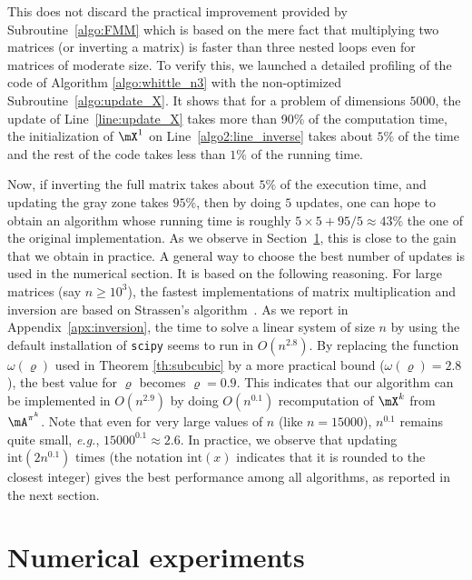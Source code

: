 This does not discard the practical improvement provided by Subroutine~\ref{algo:FMM} which is based on the mere fact that multiplying  two matrices (or inverting a matrix) is faster than three nested loops even for matrices of moderate size. To verify this, we launched  a detailed profiling of the code of Algorithm \ref{algo:whittle_n3} with the non-optimized Subroutine~\ref{algo:update_X}. It shows that for a problem of dimensions $5000$, the update of Line~\ref{line:update_X} takes more than 90\% of the computation time, the initialization of $\mX^1$ on Line~\ref{algo2:line_inverse} takes about $5\%$ of the time and the rest of the code takes less than $1\%$ of the running time.

Now, if inverting the full matrix takes about $5\%$ of the execution time, and updating the gray zone takes $95\%$, then by doing $5$ updates, one can hope to obtain an algorithm whose running time is roughly $5\times5 + 95/5\approx43\%$ the one of the original implementation. As we observe in Section~\ref{sec:numerical}, this is close to the gain that we obtain in practice. A general way to choose the best number of updates is used in the numerical section. It is based on the following reasoning. For large matrices (say $n\ge 10^3$), the fastest implementations of matrix multiplication and inversion are based on Strassen's algorithm~\cite{huang2016strassen,huang2018practical}. As we report in Appendix~\ref{apx:inversion}, the time to solve a linear system of size $n$ by using the default installation of \texttt{scipy} seems to run in $O(n^{2.8})$. By replacing the function $\omega(\varrho)$ used in Theorem \ref{th:subcubic} by a more practical bound ($\omega(\varrho)=2.8$), the best value for $\varrho$ becomes $\varrho = 0.9$. This indicates that our algorithm can be implemented in $O(n^{2.9})$ by doing $O(n^{0.1})$ recomputation of $\mX^k$ from $\mA^{\pi^k}$. Note that even for very large values of $n$ (like $n=15000$), $n^{0.1}$ remains quite small, \emph{e.g.}, $15000^{0.1}\approx 2.6$. In practice, we observe that updating $\mathrm{int}(2n^{0.1})$ times (the notation $\mathrm{int}(x)$ indicates that it is rounded to the closest integer) gives the best performance among all algorithms, as reported in the next section.

\section{Numerical experiments}
\label{sec:numerical}

